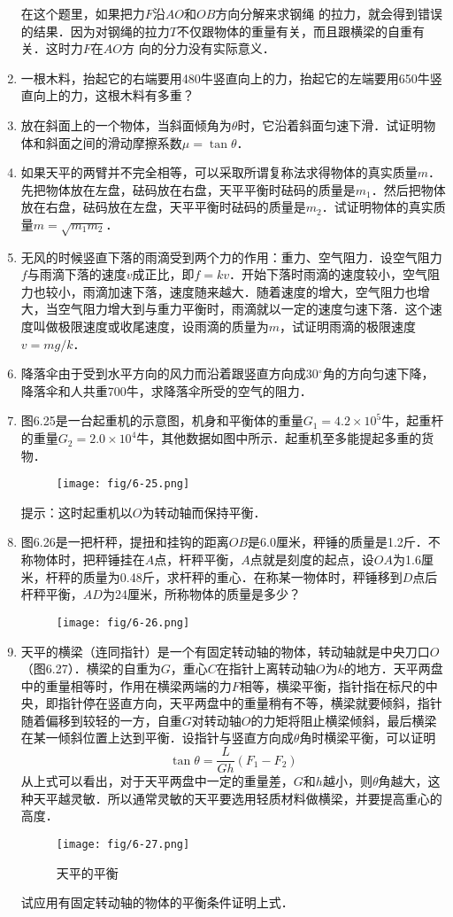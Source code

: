 \begin{enumerate}
\begin{solution}
在这个题里，如果把力$F$沿$AO$和$OB$方向分解来求钢绳
的拉力，就会得到错误的结果．因为对钢绳的拉力$T$不仅跟物体的重量有关，而且跟横梁的自重有关．这时力$F$在$AO$方
向的分力没有实际意义．
\end{solution}

\item 一根木料，抬起它的右端要用480牛竖直向上的力，抬起它的左端要用650牛竖直向上的力，这根木料有多重？
\item 放在斜面上的一个物体，当斜面倾角为$\theta$时，它沿着斜面匀速下滑．试证明物体和斜面之间的滑动摩擦系数$\mu=\tan \theta$．
\item 如果天平的两臂并不完全相等，可以采取所谓复称法求得物体的真实质量$m$．先把物体放在左盘，砝码放在右盘，天平平衡时砝码的质量是$m_1$．然后把物体放在右盘，砝码放在左盘，天平平衡时砝码的质量是$m_2$．试证明物体的真实质量$m=\sqrt{m_1m_2}$．
\item 无风的时候竖直下落的雨滴受到两个力的作用：重力、空气阻力．设空气阻力$f$与雨滴下落的速度$v$成正比，即$f=kv$．开始下落时雨滴的速度较小，空气阻力也较小，雨滴加速下落，速度随来越大．随着速度的增大，空气阻力也增大，当空气阻力增大到与重力平衡时，雨滴就以一定的速度匀速下落．这个速度叫做极限速度或收尾速度，设雨滴的质量为$m$，试证明雨滴的极限速度$v=mg/k$．
\item 降落伞由于受到水平方向的风力而沿着跟竖直方向成30$^\circ$角的方向匀速下降，降落伞和人共重700牛，求降落伞所受的空气的阻力．
\item 图6.25是一台起重机的示意图，机身和平衡体的重量$G_1=4.2\times 10^5$牛，起重杆的重量$G_2=2.0\times 10^4$牛，其他数据如图中所示．起重机至多能提起多重的货物．
\begin{figure}[htp]
\centering\texttt{[image: fig/6-25.png]}
\caption{}
\end{figure}
提示：这时起重机以$O$为转动轴而保持平衡．

\item  图6.26是一把杆秤，提扭和挂钩的距离$OB$是6.0厘米，秤锤的质量是1.2斤．不称物体时，把秤锤挂在$A$点，杆秤平衡，$A$点就是刻度的起点，设$OA$为1.6厘米，杆秤的质量为0.48斤，求杆秤的重心．在称某一物体时，秤锤移到$D$点后杆秤平衡，$AD$为24厘米，所称物体的质量是多少？
\begin{figure}[htp]
\centering\texttt{[image: fig/6-26.png]}
\caption{}
\end{figure}
\item 天平的横梁（连同指针）是一个有固定转动轴的物体，转动轴就是中央刀口$O$（图6.27）．横梁的自重为$G$，重心$C$在指针上离转动轴$O$为$k$的地方．天平两盘中的重量相等时，作用在横梁两端的力$F$相等，横梁平衡，指针指在标尺的中央，即指针停在竖直方向，天平两盘中的重量稍有不等，横梁就要倾斜，指针随着偏移到较轻的一方，自重$G$对转动轴$O$的力矩将阻止横梁倾斜，最后横梁在某一倾斜位置上达到平衡．设指针与竖直方向成$\theta$角时横梁平衡，可以证明
\[\tan\theta =\frac{L}{Gh}(F_1-F_2) \]
从上式可以看出，对于天平两盘中一定的重量差，$G$和$h$越小，则$\theta$角越大，这种天平越灵敏．所以通常灵敏的天平要选用轻质材料做横梁，并要提高重心的高度．
\begin{figure}[htp]
\centering\texttt{[image: fig/6-27.png]}
\caption{天平的平衡}
\end{figure}
试应用有固定转动轴的物体的平衡条件证明上式．


\end{enumerate}
